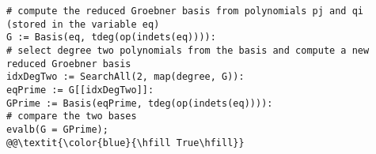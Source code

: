 \begin{lstlisting}[language=maple, caption={Maple code for the proof of Theorem~\ref{THM}.}, labellis={maple}]
# compute the reduced Groebner basis from polynomials pj and qi (stored in the variable eq)
G := Basis(eq, tdeg(op(indets(eq)))):
# select degree two polynomials from the basis and compute a new reduced Groebner basis
idxDegTwo := SearchAll(2, map(degree, G)):
eqPrime := G[[idxDegTwo]]:
GPrime := Basis(eqPrime, tdeg(op(indets(eq)))):
# compare the two bases
evalb(G = GPrime);
@@\textit{\color{blue}{\hfill True\hfill}}
\end{lstlisting}
